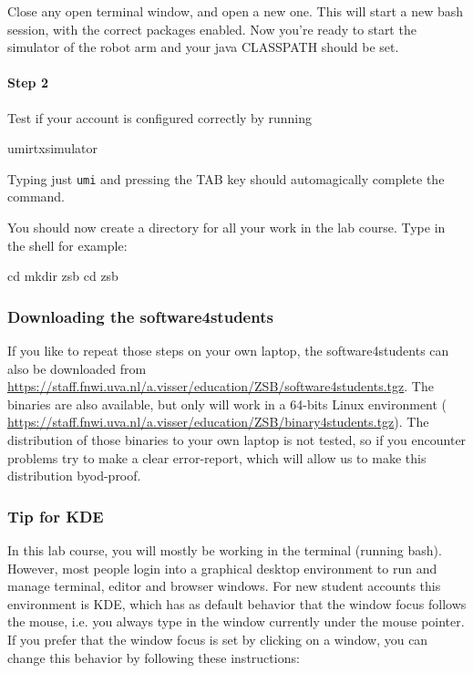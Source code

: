 \documentclass[10pt]{scrartcl}
\begin{document}
Close any open terminal window, and open a new one.
This will start a new bash session, with the correct packages enabled.
Now you're ready to start the
simulator of the robot arm and your java {\ttfamily\small CLASSPATH} should be set.

\paragraph{Step 2}
Test if your account is configured correctly by running
\begin{verbatimtab}
umirtxsimulator
\end{verbatimtab}
Typing just {\tt umi} and pressing the TAB key should automagically complete the
command.

You should now create a directory for all your work in the lab course.
Type in the shell for example:
\begin{verbatimtab}
cd
mkdir zsb
cd zsb
\end{verbatimtab}

\subsubsection*{Downloading the software4students}

If you like to repeat those steps on your own laptop, the software4students can also be downloaded from \url{https://staff.fnwi.uva.nl/a.visser/education/ZSB/software4students.tgz}. The binaries are also available, but only will work in a 64-bits Linux environment ( \url{https://staff.fnwi.uva.nl/a.visser/education/ZSB/binary4students.tgz}).  The distribution of those binaries to your own laptop is not tested, so if you encounter problems try to make a clear error-report, which will allow us to make this distribution byod-proof.
 
\subsubsection*{Tip for KDE}

In this lab course, you will mostly be working in the terminal (running bash).
However, most people login into a graphical desktop environment to run and manage
terminal, editor and browser windows.
For new student accounts this environment is KDE, which has as default behavior
that the window focus follows the mouse, i.e. you always type in the window
currently under the mouse pointer.
If you prefer that the window focus is set by clicking on a
window, you can change this behavior by following these instructions:
\end{document}
